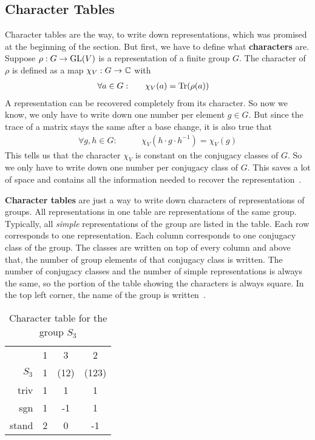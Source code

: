 \subsection{Character Tables}

Character tables are the way, to write down representations, which was promised at the beginning of the section.
But first, we have to define what \textbf{characters} are.
Suppose $\rho: G \to \operatorname{GL}(V)$ is a representation of a finite group $G$.
The character of $\rho$ is defined as a map $\chi_V: G \to \mathbb{C}$ with
\begin{align}
    \forall a \in G: \qquad & \chi_V(a) = \operatorname{Tr}(\rho(a))
\end{align}
A representation can be recovered completely from its character.
So now we know, we only have to write down one number per element $g \in G$.
But since the trace of a matrix stays the same after a base change, it is also true that
\begin{align}
    \forall g, h \in G: \qquad & \chi_V(h \cdot g \cdot h^{-1}) = \chi_V(g)
\end{align}
This tells us that the character $\chi_V$ is constant on the conjugacy classes of $G$.
So we only have to write down one number per conjugacy class of $G$.
This saves a lot of space and contains all the information needed to recover the representation~\cite{fulton2013}.

\textbf{Character tables} are just a way to write down characters of representations of groups.
All representations in one table are representations of the same group.
Typically, all \textit{simple} representations of the group are listed in the table.
Each row corresponds to one representation.
Each column corresponds to one conjugacy class of the group.
The classes are written on top of every column and above that, the number of group elements of that conjugacy class is written.
The number of conjugacy classes and the number of simple representations is always the same, so the portion of the table showing the characters is always square.
In the top left corner, the name of the group is written~\cite{fulton2013}.

\begin{table}
    \centering

    \begin{tabular}{r | c  c  c}
                & 1 & 3     & 2     \\
        $S_3$   & 1 & (12)  & (123) \\ \hline
        triv    & 1 & 1     & 1     \\
        sgn     & 1 & -1    & 1     \\
        stand   & 2 & 0     & -1
    \end{tabular}

    \caption{Character table for the group $S_3$}
    \label{tab:reprep.char.table}
\end{table}

